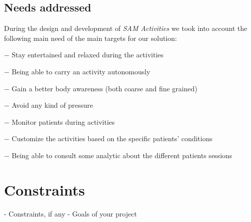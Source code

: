 	\subsection{Needs addressed}
	During the design and development of \textit{SAM Activities} we took into account the following main need of the main targets for our solution:
	\begin{description}
		\item[\textbf{Patients}:] 
				\item{$ - $} Stay entertained and relaxed during the activities
				\item{$ - $} Being able to carry an activity autonomously
				\item{$ - $} Gain a better body  awareness (both coarse and fine grained)
				\item{$ - $} Avoid any kind of pressure
	\end{description}
	\begin{description}
		\item[\textbf{Therapists}:] 
			\item{$ - $} Monitor patients during activities
			\item{$ - $} Customize the activities based on the specific patients' conditions
			\item{$ - $} Being able to consult some analytic about the different patients sessions
	\end{description}
\section{Constraints}
	

- Constraints, if any
- Goals of your project